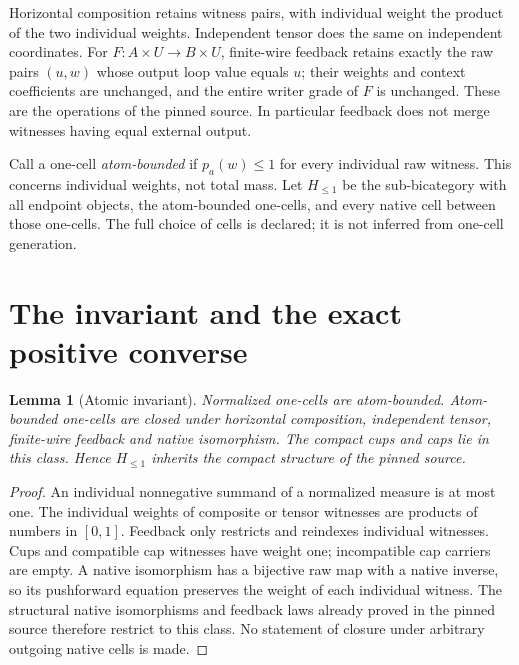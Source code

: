 \documentclass[11pt]{article}
\newtheorem{lemma}[theorem]{Lemma}
\newcommand{\Ha}{H_{\leq 1}}
\begin{document}
Horizontal composition retains witness pairs, with individual weight the product of the two individual weights. Independent tensor does the same on independent coordinates. For $F:A\times U\to B\times U$, finite-wire feedback retains exactly the raw pairs $(u,w)$ whose output loop value equals $u$; their weights and context coefficients are unchanged, and the entire writer grade of $F$ is unchanged. These are the operations of the pinned source. In particular feedback does not merge witnesses having equal external output.

Call a one-cell \emph{atom-bounded} if $p_a(w)\leq 1$ for every individual raw witness. This concerns individual weights, not total mass. Let $\Ha$ be the sub-bicategory with all endpoint objects, the atom-bounded one-cells, and every native cell between those one-cells. The full choice of cells is declared; it is not inferred from one-cell generation.

\section{The invariant and the exact positive converse}
\begin{lemma}[Atomic invariant]
Normalized one-cells are atom-bounded. Atom-bounded one-cells are closed under horizontal composition, independent tensor, finite-wire feedback and native isomorphism. The compact cups and caps lie in this class. Hence $\Ha$ inherits the compact structure of the pinned source.
\end{lemma}
\begin{proof}
An individual nonnegative summand of a normalized measure is at most one. The individual weights of composite or tensor witnesses are products of numbers in $[0,1]$. Feedback only restricts and reindexes individual witnesses. Cups and compatible cap witnesses have weight one; incompatible cap carriers are empty. A native isomorphism has a bijective raw map with a native inverse, so its pushforward equation preserves the weight of each individual witness. The structural native isomorphisms and feedback laws already proved in the pinned source therefore restrict to this class. No statement of closure under arbitrary outgoing native cells is made.
\end{proof}
\end{document}

